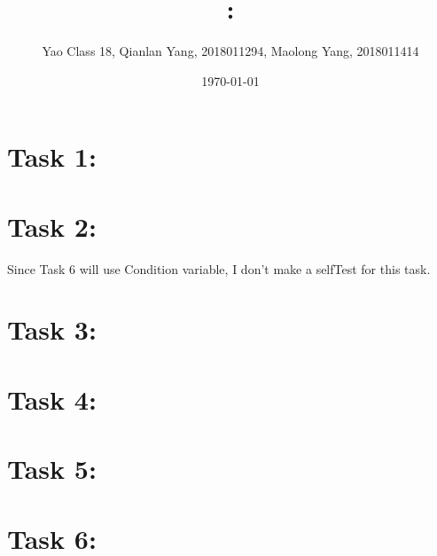 \documentclass[11pt]{article}
\title{\textmd{\bf \Class: \Title}}
\date{\today}
\author{Yao Class 18, Qianlan Yang, 2018011294, Maolong Yang, 2018011414}
\begin{document}
\begin{spacing}{1.1}
\maketitle \thispagestyle{empty}







\iffalse

\begin{figure}[h]%
	\centering  %
	\texttt{[image: image.jpg]}  %
\end{figure}

\fi

\section{Task 1:}

\section{Task 2:}

Since Task 6 will use Condition variable, I don't make a selfTest for this task.

\section{Task 3:}

\section{Task 4:}

\section{Task 5:}

\section{Task 6:}



\end{spacing}
\end{document}
